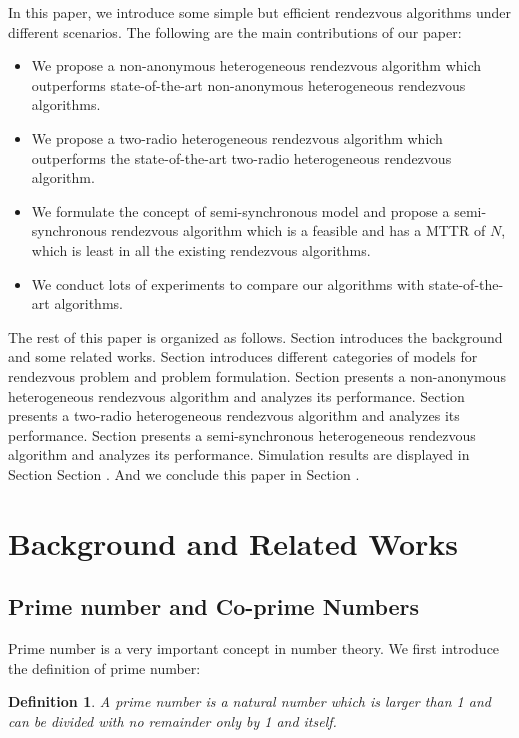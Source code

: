 \documentclass[10pt, conference, letterpaper]{IEEEtran}
\newtheorem{definition}{Definition}[section]
\begin{document}
In this paper, we introduce some simple but efficient rendezvous algorithms under different scenarios. The following are the main contributions of our paper:
\begin{itemize}
\item[1)] We propose a non-anonymous heterogeneous rendezvous algorithm which outperforms state-of-the-art non-anonymous heterogeneous rendezvous algorithms.
\item[2)] We propose a two-radio heterogeneous rendezvous algorithm which outperforms the state-of-the-art two-radio heterogeneous rendezvous algorithm.
\item[3)] We formulate the concept of semi-synchronous model and propose a semi-synchronous rendezvous algorithm which is a feasible and has a MTTR of $N$, which is least in all the existing rendezvous algorithms.
\item[4)] We conduct lots of experiments to compare our algorithms with state-of-the-art algorithms.
\end{itemize}


The rest of this paper is organized as follows. Section \uppercase\expandafter{} introduces the background and some related works. Section \uppercase\expandafter{} introduces different categories of models for rendezvous problem and problem formulation. Section \uppercase\expandafter{} presents a non-anonymous heterogeneous rendezvous algorithm and analyzes its performance. Section \uppercase\expandafter{} presents a two-radio heterogeneous rendezvous algorithm and analyzes its performance. Section \uppercase\expandafter{} presents a semi-synchronous heterogeneous rendezvous algorithm and analyzes its performance. Simulation results are displayed in Section Section \uppercase\expandafter{}. And we conclude this paper in Section \uppercase\expandafter{}.




\section{Background and Related Works}


\subsection{Prime number and Co-prime Numbers}
Prime number is a very important concept in number theory. We first introduce the definition of prime number:
\begin{definition}
A prime number is a natural number which is larger than 1 and can be divided with no remainder only by 1 and itself.
\end{definition}
\end{document}
